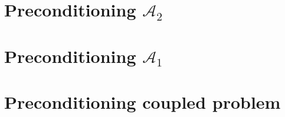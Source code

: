 \documentclass[r]{siamart171218}
\begin{document}
\section{Preconditioning $\mathcal{A}_2$}\label{sec:problem_omega}


\section{Preconditioning $\mathcal{A}_1$}\label{sec:problem_gamma}


\section{Preconditioning coupled problem}\label{sec:coupled}





\end{document}
